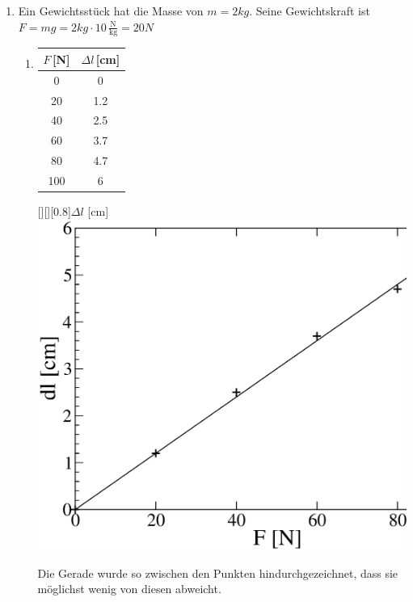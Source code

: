 \documentclass[%
11pt,%
twoside,%
titlepage,%
german,%
headsepline%
]{scrartcl}
\newcommand{\ufrac}[2]{\ensuremath{\,\frac{\mathrm{#1}}{\mathrm{#2}}}}
\begin{document}
{{\begin{enumerate}
\item Ein Gewichtsst\"uck hat die Masse von $m=2\unit{kg}$. Seine Gewichtskraft ist $F=mg=2\unit{kg}\cdot 10\ufrac{N}{kg}=20\unit{N}$
\begin{enumerate}
\item \mbox{}\vspace*{-2\baselineskip}
\begin{center}
\begin{minipage}{4cm}
\centering
\begin{tabular}{|c|c|}
\hline
$F$\,[N] & $\Delta l$\,[cm] \\ \hline\hline
0 & 0 \\ \hline
20 & 1.2 \\ \hline
40 & 2.5 \\ \hline
60 & 3.7 \\ \hline
80 & 4.7 \\ \hline
100 & 6 \\ \hline
\end{tabular}
\end{minipage}
\hspace{2cm}
\begin{minipage}{6cm}
[][][0.8]{$\Delta l$ [cm]}
\includegraphics[width=\linewidth]{pictures/flfeder.eps}
\end{minipage}
\end{center}
Die Gerade wurde so zwischen den Punkten hindurchgezeichnet, dass sie m\"oglichst wenig von diesen abweicht.


\end{enumerate}
\end{enumerate}}}
\end{document}
